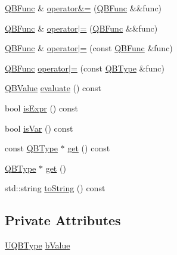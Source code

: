 \begin{DoxyCompactItemize}
\hyperlink{classQuickMath_1_1QBFunc}{Q\+B\+Func} \& \hyperlink{classQuickMath_1_1QBFunc_abd44f26a6b8db3694a1caef95278220f}{operator\&=} (\hyperlink{classQuickMath_1_1QBFunc}{Q\+B\+Func} \&\&func)
\item 
\hyperlink{classQuickMath_1_1QBFunc}{Q\+B\+Func} \& \hyperlink{classQuickMath_1_1QBFunc_a830fc921fb1ca579bd174ce3477bb1b0}{operator$\vert$=} (\hyperlink{classQuickMath_1_1QBFunc}{Q\+B\+Func} \&\&func)
\item 
\hyperlink{classQuickMath_1_1QBFunc}{Q\+B\+Func} \& \hyperlink{classQuickMath_1_1QBFunc_a377042ac0c178a209c38603f4031952a}{operator$\vert$=} (const \hyperlink{classQuickMath_1_1QBFunc}{Q\+B\+Func} \&func)
\item 
\hyperlink{classQuickMath_1_1QBFunc}{Q\+B\+Func} \hyperlink{classQuickMath_1_1QBFunc_ad6a4a1ad9c0b1a157ffc2079b993e99c}{operator$\vert$=} (const \hyperlink{classQuickMath_1_1QBType}{Q\+B\+Type} \&func)
\item 
\hyperlink{namespaceQuickMath_aec13b08c42d9f8e688241623c8b379a0}{Q\+B\+Value} \hyperlink{classQuickMath_1_1QBFunc_a916d28b606961e501f417b507f8c8636}{evaluate} () const 
\item 
bool \hyperlink{classQuickMath_1_1QBFunc_aa9de5d9970a0045720c34e6bf3e302da}{is\+Expr} () const 
\item 
bool \hyperlink{classQuickMath_1_1QBFunc_a5eed8d5849a3374dd0eb054bb5b2df53}{is\+Var} () const 
\item 
const \hyperlink{classQuickMath_1_1QBType}{Q\+B\+Type} $\ast$ \hyperlink{classQuickMath_1_1QBFunc_aecfc380fec5a717235001086c614f13f}{get} () const 
\item 
\hyperlink{classQuickMath_1_1QBType}{Q\+B\+Type} $\ast$ \hyperlink{classQuickMath_1_1QBFunc_a9da6494f27c467275d1bf66c57e0871e}{get} ()
\item 
std\+::string \hyperlink{classQuickMath_1_1QBFunc_a2598989f19cf9260b93db7840bb87922}{to\+String} () const 
\end{DoxyCompactItemize}
\subsection*{Private Attributes}
\begin{DoxyCompactItemize}
\item 
\hyperlink{namespaceQuickMath_af54af2708effd817452548da857ba076}{U\+Q\+B\+Type} \hyperlink{classQuickMath_1_1QBFunc_af53f2f11b453fbb4e55310d9a34f5da2}{b\+Value}
\end{DoxyCompactItemize}
